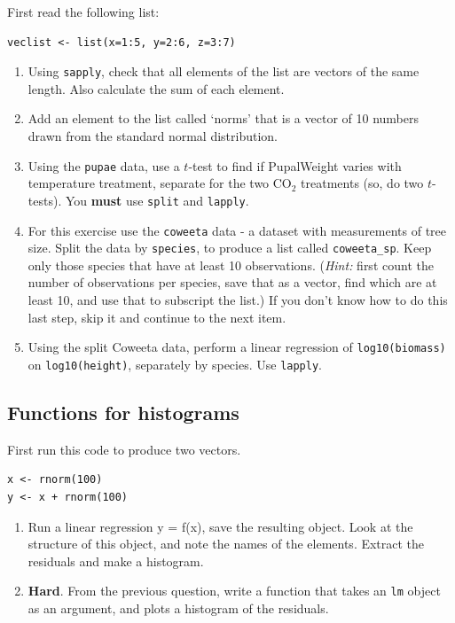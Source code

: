 \documentclass[]{book}
\begin{document}
First read the following list:

\begin{verbatim}
veclist <- list(x=1:5, y=2:6, z=3:7)
\end{verbatim}

\begin{enumerate}
\def\labelenumi{\arabic{enumi}.}
\item
  Using \texttt{sapply}, check that all elements of the list are vectors of the same length. Also calculate the sum of each element.
\item
  Add an element to the list called `norms' that is a vector of 10 numbers drawn from the standard normal distribution.
\item
  Using the \texttt{pupae} data, use a \(t\)-test to find if PupalWeight varies with temperature treatment, separate for the two CO\(_2\) treatments (so, do two \(t\)-tests). You \textbf{must} use \texttt{split} and \texttt{lapply}.
\item
  For this exercise use the \texttt{coweeta} data - a dataset with measurements of tree size. Split the data by \texttt{species}, to produce a list called \texttt{coweeta\_sp}. Keep only those species that have at least 10 observations. (\emph{Hint:} first count the number of observations per species, save that as a vector, find which are at least 10, and use that to subscript the list.) If you don't know how to do this last step, skip it and continue to the next item.
\item
  Using the split Coweeta data, perform a linear regression of \texttt{log10(biomass)} on \texttt{log10(height)}, separately by species. Use \texttt{lapply}.
\end{enumerate}

\hypertarget{functions-for-histograms}{%
\subsection{Functions for histograms}\label{functions-for-histograms}}

First run this code to produce two vectors.

\begin{verbatim}
x <- rnorm(100)
y <- x + rnorm(100)
\end{verbatim}

\begin{enumerate}
\def\labelenumi{\arabic{enumi}.}
\item
  Run a linear regression y = f(x), save the resulting object. Look at the structure of this object, and note the names of the elements. Extract the residuals and make a histogram.
\item
  \textbf{Hard}. From the previous question, write a function that takes an \texttt{lm} object as an argument, and plots a histogram of the residuals.
\end{enumerate}
\end{document}
